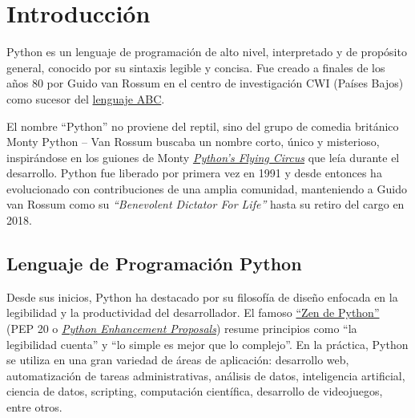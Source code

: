 \chapter{Introducción}
Python es un lenguaje de programación de alto nivel, interpretado y de propósito general, conocido por su sintaxis legible y concisa.
Fue creado a finales de los años 80 por Guido van Rossum en el centro de investigación CWI (Países Bajos) como sucesor del 
\href{https://docs.python.org/3/license.html}{lenguaje ABC}. 

El nombre “Python” no proviene del reptil, sino del grupo de comedia británico Monty Python – Van Rossum buscaba un nombre corto, 
único y misterioso, inspirándose en los guiones de Monty \href{https://docs.python.org/3/faq/general.html}{\textit{Python’s Flying Circus}} 
que leía durante el desarrollo. Python fue liberado por primera vez en 1991 y desde entonces ha evolucionado con contribuciones de una amplia 
comunidad, manteniendo a Guido van Rossum como su \textit{“Benevolent Dictator For Life”} hasta su retiro del cargo en 2018.

\section{Lenguaje de Programación Python}
Desde sus inicios, Python ha destacado por su filosofía de diseño enfocada en la legibilidad y la productividad del desarrollador. 
El famoso \href{https://peps.python.org/pep-0020/}{“Zen de Python”} (PEP 20 o \href{https://peps.python.org/pep-0000/}{\textit{Python Enhancement Proposals}}) resume principios como “la legibilidad cuenta” y “lo simple es mejor que lo complejo”. 
En la práctica, Python se utiliza en una gran variedad de áreas de aplicación: desarrollo web, automatización de tareas administrativas, 
análisis de datos, inteligencia artificial, ciencia de datos, scripting, computación científica, desarrollo de videojuegos, entre otros.

